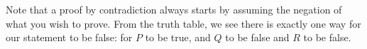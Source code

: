 \documentclass[12pt]{exam}
\begin{document}
\begin{questions}
\begin{solution}
  Note that a proof by contradiction always starts by assuming the negation of what you wish to prove.  From the truth table, we see there is exactly one way for our statement to be false: for $P$ to be true, and $Q$ to be false and $R$ to be false.
\end{solution}
\vfill
\end{questions}
\end{document}
